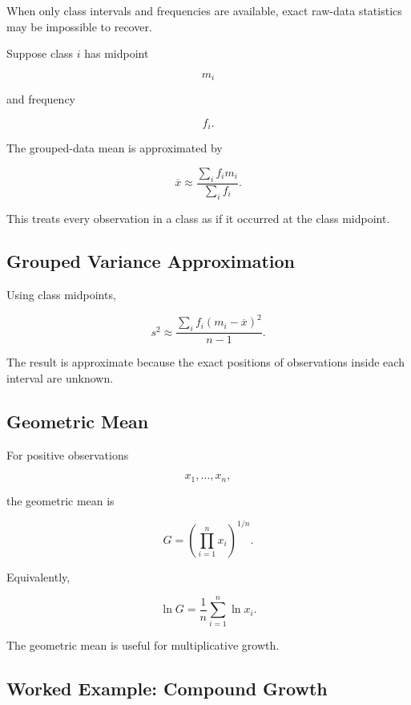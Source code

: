 When only class intervals and frequencies are available, exact raw-data
statistics may be impossible to recover.

Suppose class \(i\) has midpoint

\[
m_i
\]

and frequency

\[
f_i.
\]

The grouped-data mean is approximated by

\[
\boxed{
\overline{x}
\approx
\frac{
\sum_i f_im_i
}{
\sum_i f_i
}.
}
\]

This treats every observation in a class as if it occurred at the class
midpoint.

\subsection{Grouped Variance Approximation}
\label{subsec:grouped-variance}

Using class midpoints,

\[
\boxed{
s^2
\approx
\frac{
\sum_i
f_i(m_i-\overline{x})^2
}{
n-1
}.
}
\]

The result is approximate because the exact positions of observations
inside each interval are unknown.

\subsection{Geometric Mean}
\label{subsec:geometric-mean}

For positive observations

\[
x_1,\ldots,x_n,
\]

the geometric mean is

\[
\boxed{
G
=
\left(
\prod_{i=1}^{n}x_i
\right)^{1/n}.
}
\]

Equivalently,

\[
\boxed{
\ln G
=
\frac1n
\sum_{i=1}^{n}\ln x_i.
}
\]

The geometric mean is useful for multiplicative growth.

\subsection{Worked Example: Compound Growth}
\label{subsec:worked-geometric-mean}

